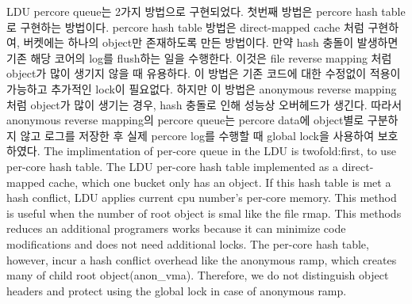 \ifkor
LDU percore queue는 2가지 방법으로 구현되었다. 
첫번째 방법은 percore hash table로 구현하는 방법이다.
percore hash table 방법은 direct-mapped cache 처럼 구현하여, 버켓에는 하나의 object만 존재하도록
만든 방법이다. 
만약 hash 충돌이 발생하면 기존 해당 코어의 log를 flush하는 일을 수행한다.
이것은 file reverse mapping 처럼 object가 많이 생기지 않을 때 유용하다. 
이 방법은 기존 코드에 대한 수정없이 적용이 가능하고 추가적인 lock이 필요없다.
하지만 이 방법은 anonymous reverse mapping 처럼 object가 많이 생기는 경우, hash 충돌로 인해 
성능상 오버헤드가 생긴다. 
따라서 anonymous reverse mapping의 percore queue는 percore data에 object별로
구분하지 않고 로그를 저장한 후 실제 percore log를 수행할 때 global lock을 사용하여 보호하였다. 
\else
The implimentation of per-core queue in the LDU is twofold:first, to use
per-core hash table. 
The LDU per-core hash table implemented as a direct-mapped cache, which one
bucket only has an object.
If this hash table is met a hash conflict, LDU applies current cpu number's
per-core memory.
This method is useful when the number of root object is smal like the file rmap.
This methods reduces an additional programers works because it can minimize
code modifications and does not need additional locks.
The per-core hash table, however, incur a hash conflict overhead like the
anonymous ramp, which creates many of child root object(anon\_vma).
Therefore, we do not distinguish object headers and protect using the global
lock in case of anonymous ramp.
\fi





